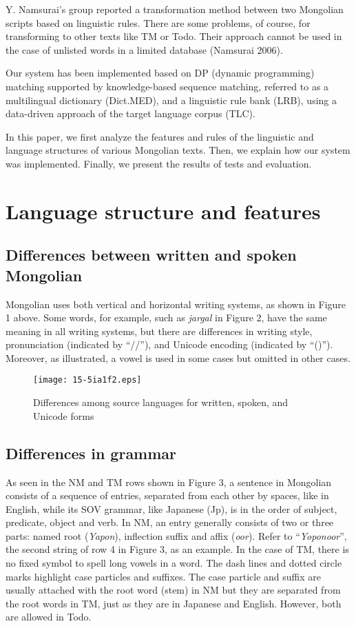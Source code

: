 \documentclass[english]{jnlp_1.4}
\begin{document}
Y. Namsurai's group reported a transformation method between two Mongolian 
scripts based on linguistic rules. There are some problems, of course, for 
transforming to other texts like TM or Todo. Their approach cannot be used 
in the case of unlisted words in a limited database (Namsurai 2006).

Our system has been implemented based on DP (dynamic programming) matching 
supported by knowledge-based sequence matching, referred to as a 
multilingual dictionary (Dict.MED), and a linguistic rule bank (LRB), using 
a data-driven approach of the target language corpus (TLC).

In this paper, we first analyze the features and rules of the linguistic and 
language structures of various Mongolian texts. Then, we explain how our 
system was implemented. Finally, we present the results of tests and 
evaluation.


\section{Language structure and features}


\subsection{Differences between written and spoken Mongolian}

Mongolian uses both vertical and horizontal writing systems, as shown in 
Figure 1 above. Some words, for example, such as \textit{jargal} in Figure 2, have the same 
meaning in all writing systems, but there are differences in writing style, 
pronunciation (indicated by ``//''), and Unicode encoding (indicated by 
``()''). Moreover, as illustrated, a vowel is used in some cases but omitted 
in other cases.

\begin{figure}[b]
\centerline{\texttt{[image: 15-5ia1f2.eps]}}
\caption{Differences among source languages for written, spoken, and Unicode forms}
\label{fig2}
\end{figure}



\subsection{Differences in grammar}

As seen in the NM and TM rows shown in Figure 3, a sentence in Mongolian 
consists of a sequence of entries, separated from each other by spaces, like 
in English, while its SOV grammar, like Japanese (Jp), is in the order of 
subject, predicate, object and verb. In NM, an entry generally consists of 
two or three parts: named root (\textit{Yapon}), inflection suffix and affix (\textit{oor}). Refer to 
``\textit{Yoponoor}'', the second string of row 4 in Figure 3, as an example. In the case of 
TM, there is no fixed symbol to spell long vowels in a word. The dash lines 
and dotted circle marks highlight case particles and suffixes. The case 
particle and suffix are usually attached with the root word (stem) in NM but 
they are separated from the root words in TM, just as they are in Japanese 
and English. However, both are allowed in Todo.
\end{document}
